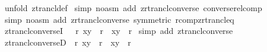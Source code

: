 \begin{isabellebody}
%
\isadelimproof
%
\endisadelimproof
%
\isatagproof
{}\isamarkupfalse%
\ {\isacharparenleft}unfold\ ztrancl{\isacharunderscore}def{\isacharparenright}\isanewline
{}\isamarkupfalse%
\ {\isacharparenleft}simp\ {\isacharparenleft}no{\isacharunderscore}asm{\isacharparenright}\ add{\isacharcolon}\ zrtrancl{\isacharunderscore}converse\ converse{\isacharunderscore}rel{\isacharunderscore}comp{\isacharparenright}\isanewline
{}\isamarkupfalse%
\ {\isacharparenleft}simp\ {\isacharparenleft}no{\isacharunderscore}asm{\isacharparenright}\ add{\isacharcolon}\ zrtrancl{\isacharunderscore}converse\ {\isacharbrackleft}symmetric{\isacharbrackright}\ r{\isacharunderscore}comp{\isacharunderscore}zrtrancl{\isacharunderscore}eq{\isacharparenright}\isanewline
{}\isamarkupfalse%
%
\endisatagproof
{\isafoldproof}%
%
\isadelimproof
\isanewline
%
\endisadelimproof
\isanewline
\isanewline
{}\isamarkupfalse%
\ ztrancl{\isacharunderscore}converseI\ {\isacharcolon}\ {\isachardoublequoteopen}{\isacharbang}{\isacharbang}\ r{\isachardot}\ {\isacharparenleft}x{\isacharcomma}y{\isacharparenright}\ {\isacharcolon}\ {\isacharparenleft}r{\isacharpercent}{\isacharplus}{\isacharparenright}{\isacharcircum}{\isacharminus}{}\ {\isacharequal}{\isacharequal}{\isachargreater}\ {\isacharparenleft}x{\isacharcomma}y{\isacharparenright}\ {\isacharcolon}\ {\isacharparenleft}r{\isacharcircum}{\isacharminus}{}{\isacharparenright}{\isacharpercent}{\isacharplus}{\isachardoublequoteclose}\isanewline
%
\isadelimproof
%
\endisadelimproof
%
\isatagproof
{}\isamarkupfalse%
\ {\isacharparenleft}simp\ add{\isacharcolon}\ ztrancl{\isacharunderscore}converse{\isacharparenright}\isanewline
{}\isamarkupfalse%
%
\endisatagproof
{\isafoldproof}%
%
\isadelimproof
\isanewline
%
\endisadelimproof
\isanewline
\isanewline
{}\isamarkupfalse%
\ ztrancl{\isacharunderscore}converseD\ {\isacharcolon}\ {\isachardoublequoteopen}{\isacharbang}{\isacharbang}r{\isachardot}\ {\isacharparenleft}x{\isacharcomma}y{\isacharparenright}\ {\isacharcolon}\ {\isacharparenleft}r{\isacharcircum}{\isacharminus}{}{\isacharparenright}{\isacharpercent}{\isacharplus}\ {\isacharequal}{\isacharequal}{\isachargreater}\ {\isacharparenleft}x{\isacharcomma}y{\isacharparenright}\ {\isacharcolon}\ {\isacharparenleft}r{\isacharpercent}{\isacharplus}{\isacharparenright}{\isacharcircum}{\isacharminus}{}{\isachardoublequoteclose}\isanewline
%
\isadelimproof
%
\endisadelimproof
%
\isatagproof
{}\isamarkupfalse%

\end{isabellebody}
